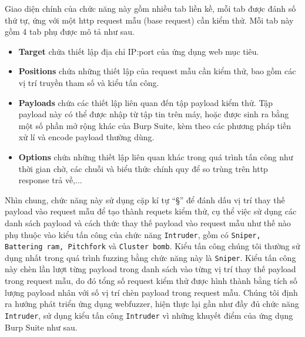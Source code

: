 Giao diện chính của chức năng này gồm nhiều tab liền kề, mỗi tab được đánh số thứ tự, ứng với một \acrshort{http} request mẫu (base request) cần kiểm thử. Mỗi tab này gồm 4 tab phụ được mô tả như sau.
\begin{itemize}
    \item \textbf{Target} chứa thiết lập địa chỉ IP:port của ứng dụng web mục tiêu.
    \item \textbf{Positions} chứa những thiết lập của request mẫu cần kiểm thử, bao gồm các vị trí truyền tham số và kiểu tấn công.
    \item \textbf{Payloads} chứa các thiết lập liên quan đến tập payload kiểm thử. Tập payload này có thể được nhập từ tập tin trên máy, hoặc được sinh ra bằng một số phần mở rộng khác của Burp Suite, kèm theo các phương pháp tiền xử lí và encode payload thường dùng.
    \item \textbf{Options} chứa những thiết lập liên quan khác trong quá trình tấn công như thời gian chờ, các chuỗi và biểu thức chính quy để so trùng trên \acrshort{http} response trả về,...
\end{itemize}
Nhìn chung, chức năng này sử dụng cặp kí tự ``§'' để đánh dấu vị trí thay thế payload vào request mẫu để tạo thành requets kiểm thử, cụ thể việc sử dụng các danh sách payload và cách thức thay thế payload vào request mẫu như thế nào phụ thuộc vào kiểu tấn công của chức năng \texttt{Intruder}, gồm có \texttt{Sniper, Battering ram, Pitchfork} và \texttt{Cluster bomb}. Kiểu tấn công chúng tôi thường sử dụng nhất trong quá trình fuzzing bằng chức năng này là \texttt{Sniper}. Kiểu tấn công này chèn lần lượt từng payload trong danh sách vào từng vị trí thay thế payload trong request mẫu, do đó tổng số request kiểm thử được hình thành bằng tích số lượng payload nhân với số vị trí chèn payload trong request mẫu. Chúng tôi định ra hướng phát triển ứng dụng webfuzzer, hiện thực lại gần như đầy đủ chức năng \texttt{Intruder}, sử dụng kiểu tấn công \texttt{Intruder} vì những khuyết điểm của ứng dụng Burp Suite như sau.
